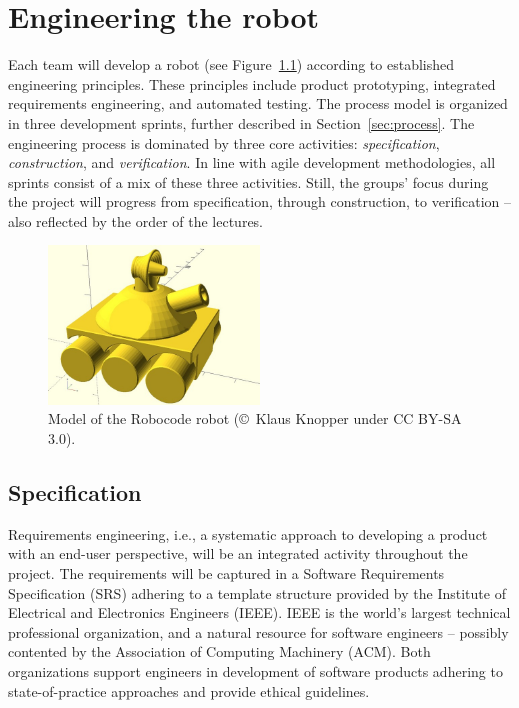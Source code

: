 \documentclass{scrreprt}
\begin{document}
\chapter{Engineering the robot}
Each team will develop a robot (see Figure~\ref{fig:robot}) according to established engineering principles. These principles include product prototyping, integrated requirements engineering, and automated testing. The process model is organized in three development sprints, further described in Section~\ref{sec:process}. The engineering process is dominated by three core activities: \textit{specification}, \textit{construction}, and \textit{verification}. In line with agile development methodologies, all sprints consist of a mix of these three activities. Still, the groups' focus during the project will progress from specification, through construction, to verification -- also reflected by the order of the lectures.

\begin{figure}
\centering
\includegraphics[width=0.50\textwidth]{figures/robotSide.jpg}
\caption{Model of the Robocode robot (\copyright~Klaus Knopper under CC BY-SA 3.0).}
\label{fig:robot}
\end{figure}

\section{Specification}
Requirements engineering, i.e., a systematic approach to developing a product with an end-user perspective, will be an integrated activity throughout the project. The requirements will be captured in a Software Requirements Specification (SRS) adhering to a template structure provided by the Institute of Electrical and Electronics Engineers (IEEE). IEEE is the world's largest technical professional organization, and a natural resource for software engineers -- possibly contented by the Association of Computing Machinery (ACM). Both organizations support engineers in development of software products adhering to state-of-practice approaches and provide ethical guidelines.
\end{document}
